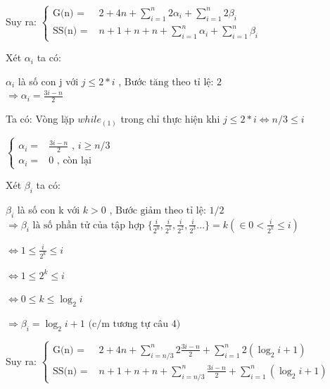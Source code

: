 \documentclass{article}
\newcommand\tab[1][1cm]{\hspace*{#1}}
\begin{document}
\tab Suy ra:
\(
\begin{cases}
    \text{G(n) = } & 2 + 4n +  \sum\limits_{i=1}^{n}2\alpha_{i} + \sum\limits_{i=1}^{n}2\beta_{i} \\
    \text{SS(n) = } &  n + 1 + n + n + \sum\limits_{i=1}^{n}\alpha_{i} + \sum\limits_{i=1}^{n}\beta_{i}
\end{cases}
\)
\vspace{20mm}

Xét $\alpha_{i}$ ta có:

\tab $\alpha_{i}$ là số con j với $j \leq 2*i $ , \(\text{Bước tăng theo tỉ lệ: } 2\)\\

\(\Rightarrow  \alpha_{i} = \frac{3i - n}{2}\) 
\vspace{5mm}

Ta có:
\tab Vòng lặp $while_{(1)}$ trong chỉ thực hiện khi $ j \leq 2*i \Longleftrightarrow n/3 \leq i$

\vspace{5mm}
\(
\begin{cases}
    \alpha_{i} =  & \frac{3i-n}{2} \text{ , } i \geq n/3  \\
    \alpha_{i} =  & 0 \text{ , còn lại}
\end{cases}
\)
 
\vspace{20mm}
Xét $\beta_{i}$ ta có:

\tab $\beta_{i}$ là số con k với $k > 0 $ , \(\text{Bước giảm theo tỉ lệ: } 1/2\)\\


\(\Rightarrow  \beta_{i} \text{ là số phần tử của tập hợp } \{ \frac{i}{2^0}, \frac{i}{2^1},  \frac{i}{2^2},  \frac{i}{2^3}... \}
= k (\in 0 < \frac{i}{2^k} \leq i)\) 
\vspace{5mm}

\(\Leftrightarrow  1 \leq  \frac{i}{2^k} \leq  i\)

\vspace{2mm}
\(\Leftrightarrow  1 \leq  2^k \leq  i\)

\vspace{2mm}
\(\Leftrightarrow  0 \leq k \leq  \log_{2}{i} \) 

\(\Rightarrow  \beta_{i} = \log_{2}{i} + 1 \text{ (c/m tương tự câu 4)}\) 
\vspace{10mm}

\tab Suy ra:
\(
\begin{cases}
    \text{G(n) = } & 2 + 4n +  \sum\limits_{i=n/3}^{n}2\frac{3i-n}{2} + \sum\limits_{i=1}^{n}2(\log_{2}{i} + 1) \\
    \text{SS(n) = } &  n + 1 + n + n + \sum\limits_{i=n/3}^{n}\frac{3i-n}{2} + \sum\limits_{i=1}^{n}(\log_{2}{i} + 1)
\end{cases}
\)
\end{document}
